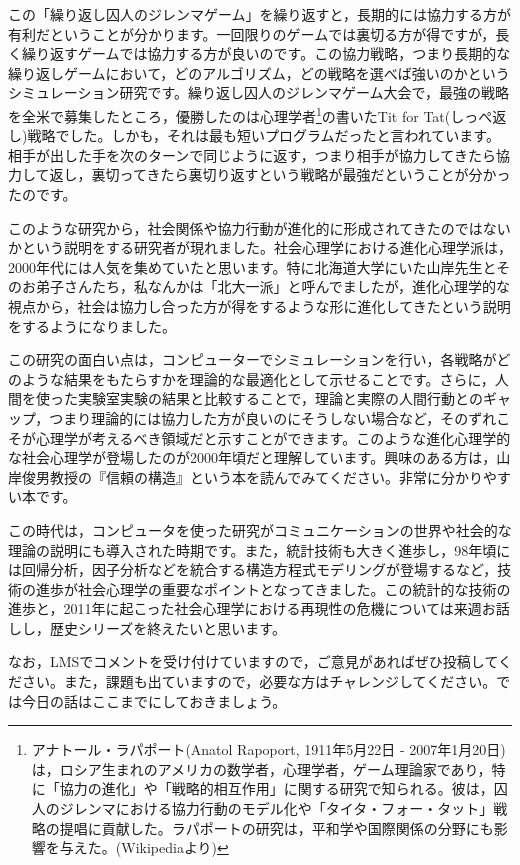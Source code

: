 \documentclass{ltjsbook}
\begin{document}
この「繰り返し囚人のジレンマゲーム」を繰り返すと，長期的には協力する方が有利だということが分かります。一回限りのゲームでは裏切る方が得ですが，長く繰り返すゲームでは協力する方が良いのです。この協力戦略，つまり長期的な繰り返しゲームにおいて，どのアルゴリズム，どの戦略を選べば強いのかというシミュレーション研究です。繰り返し囚人のジレンマゲーム大会で，最強の戦略を全米で募集したところ，優勝したのは心理学者\footnote{アナトール・ラパポート(Anatol Rapoport, 1911年5月22日 - 2007年1月20日)は，ロシア生まれのアメリカの数学者，心理学者，ゲーム理論家であり，特に「協力の進化」や「戦略的相互作用」に関する研究で知られる。彼は，囚人のジレンマにおける協力行動のモデル化や「タイタ・フォー・タット」戦略の提唱に貢献した。ラパポートの研究は，平和学や国際関係の分野にも影響を与えた。(Wikipediaより)}の書いたTit for Tat(しっぺ返し)戦略でした。しかも，それは最も短いプログラムだったと言われています。相手が出した手を次のターンで同じように返す，つまり相手が協力してきたら協力して返し，裏切ってきたら裏切り返すという戦略が最強だということが分かったのです。

このような研究から，社会関係や協力行動が進化的に形成されてきたのではないかという説明をする研究者が現れました。社会心理学における進化心理学派は，2000年代には人気を集めていたと思います。特に北海道大学にいた山岸先生とそのお弟子さんたち，私なんかは「北大一派」と呼んでましたが，進化心理学的な視点から，社会は協力し合った方が得をするような形に進化してきたという説明をするようになりました。

この研究の面白い点は，コンピューターでシミュレーションを行い，各戦略がどのような結果をもたらすかを理論的な最適化として示せることです。さらに，人間を使った実験室実験の結果と比較することで，理論と実際の人間行動とのギャップ，つまり理論的には協力した方が良いのにそうしない場合など，そのずれこそが心理学が考えるべき領域だと示すことができます。このような進化心理学的な社会心理学が登場したのが2000年頃だと理解しています。興味のある方は，山岸俊男教授の『信頼の構造』という本\parencite{Yamagishi}を読んでみてください。非常に分かりやすい本です。

この時代は，コンピュータを使った研究がコミュニケーションの世界や社会的な理論の説明にも導入された時期です。また，統計技術も大きく進歩し，98年頃には回帰分析，因子分析などを統合する構造方程式モデリングが登場するなど，技術の進歩が社会心理学の重要なポイントとなってきました。この統計的な技術の進歩と，2011年に起こった社会心理学における再現性の危機については来週お話しし，歴史シリーズを終えたいと思います。

なお，LMSでコメントを受け付けていますので，ご意見があればぜひ投稿してください。また，課題も出ていますので，必要な方はチャレンジしてください。では今日の話はここまでにしておきましょう。
\end{document}
